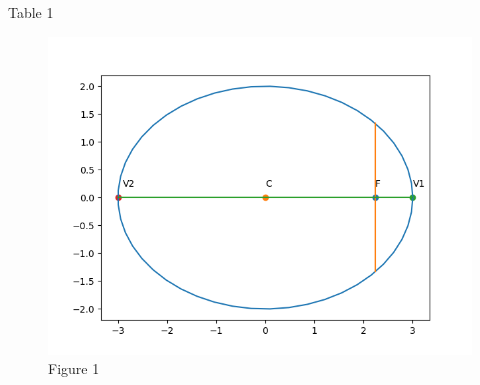\documentclass[journal,12pt,twocolumn]{IEEEtran}
\begin{document}
\begin{table}[h!]
\begin{center}

\end{center}
\caption{Table 1}
\label{tab:}
\end{table}

\begin{figure}[h!]
  \centering
    \includegraphics[width=\columnwidth]{figs/Figure_1.png}
    \caption{Figure 1}
    \label{fig:}
\end{figure}
\end{document}
